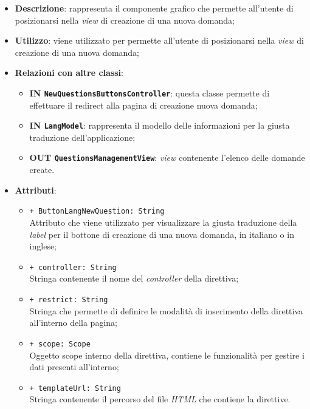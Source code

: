 \begin{itemize}
	\item \textbf{Descrizione}: rappresenta il componente grafico che permette all'utente di posizionarsi nella \textit{view} di creazione di una nuova domanda;
	\item \textbf{Utilizzo}: viene utilizzato per permette all'utente di posizionarsi nella \textit{view} di creazione di una nuova domanda;
	\item \textbf{Relazioni con altre classi}: 
	\begin{itemize}
		\item \textbf{IN \texttt{NewQuestionsButtonsController}}: questa classe permette di effettuare il redirect alla pagina di creazione nuova domanda; 
		\item \textbf{IN \texttt{LangModel}}: rappresenta il modello delle informazioni per la giusta traduzione dell'applicazione;
		\item \textbf{OUT \texttt{QuestionsManagementView}}: \textit{view} contenente l'elenco delle domande create.
	\end{itemize}
	\item \textbf{Attributi}: 
	\begin{itemize}
		\item \texttt{+ ButtonLangNewQuestion: String} \\ Attributo che viene utilizzato per visualizzare la giusta traduzione della \textit{label} per il bottone di creazione di una nuova domanda, in italiano o in inglese;
		\item \texttt{+ controller: String} \\ Stringa contenente il nome del \textit{controller} della direttiva;
		\item \texttt{+ restrict: String} \\ Stringa che permette di definire le modalità di inserimento della direttiva all'interno della pagina;
		\item \texttt{+ scope: Scope} \\ Oggetto scope interno della direttiva, contiene le funzionalità per gestire i dati presenti all'interno;
		\item \texttt{+ templateUrl: String} \\ Stringa contenente il percorso del file \textit{HTML} che contiene la direttive.
	\end{itemize}
\end{itemize}